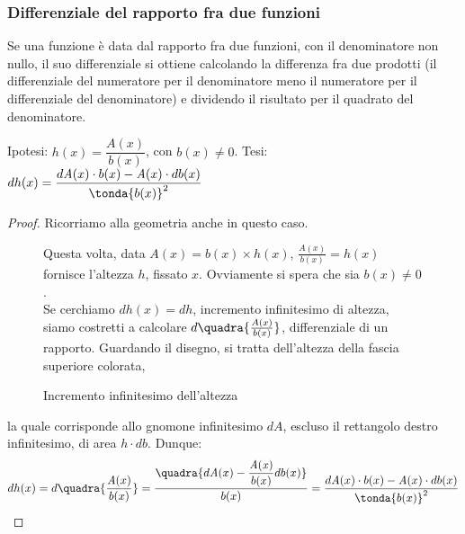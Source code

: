 \subsubsection{Differenziale del rapporto fra due funzioni}
\label{}
\begin{teorema}
 Se una funzione è data dal rapporto fra due funzioni, con il denominatore
 non nullo, il suo  differenziale si ottiene calcolando
 la differenza fra due prodotti (il differenziale del numeratore per il 
 denominatore meno il numeratore per il differenziale del denominatore)
 e dividendo il risultato per il quadrato del denominatore.
\end{teorema}
\noindent Ipotesi: $h(x)=\dfrac{\mathit{A}(x)}{b(x)}$, con $b(x)\neq 0$.\tab 
Tesi: 
$dh(x)=\dfrac{d\mathit{A}(x) \cdot b(x)-\mathit{A}(x) \cdot db(x)}
             {\tonda{b(x)}^2}$

\begin{proof}
Ricorriamo alla geometria anche in questo caso.

\begin{figure}[h]
\begin{inaccessibleblock}
 \begin{center}
 \begin{minipage}[]{.38 \textwidth}
Questa volta, data $\mathit{A}(x)=b(x)\times h(x)$, 
$\frac{A(x)}{b(x)}=h(x)$ fornisce l'altezza $h$, fissato $x$. 
Ovviamente si spera che sia $b(x)\neq 0$.\\
Se cerchiamo $dh(x)=dh$, incremento infinitesimo di altezza, siamo costretti 
a calcolare
$d\quadra{\frac{A(x)}{b(x)}}$, differenziale di un rapporto. Guardando il 
disegno,
si tratta dell'altezza della fascia superiore colorata,
 \end{minipage} 
 \hfill
 \begin{minipage}[]{.58 \textwidth}
  \differenzialerapporto
  \caption{Incremento infinitesimo dell'altezza} 
 \end{minipage}
 \end{center}
\end{inaccessibleblock}
\label{fig:Incre_prodotto}
\end{figure}


\noindent la quale corrisponde allo
gnomone infinitesimo $d\mathit{A}$, escluso il rettangolo destro infinitesimo,
di area $h\cdot db$.
Dunque:
\begin{align*}
 dh(x)=d\quadra{\frac{\mathit{A}(x)}{b(x)}}=
 \dfrac{\quadra{d\mathit{A}(x) - \dfrac{\mathit{A(x)}}{b(x)}db(x)}}{b(x)}=
 \dfrac{d\mathit{A}(x) \cdot b(x)-\mathit{A}(x) \cdot db(x)} {\tonda{b(x)}^2}
\end{align*}
\end{proof}

